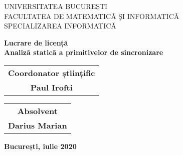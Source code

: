 \begin{titlepage}
    \begin{center}
        \Large
        UNIVERSITATEA BUCUREȘTI
        \\FACULTATEA DE MATEMATICǍ ŞI INFORMATICǍ
        \\SPECIALIZAREA INFORMATICǍ

        \vspace*{4cm}
        \textbf{Lucrare de licență}
        \\\LARGE \textbf{Analiză statică a primitivelor de sincronizare}
        
        \vfill
    \end{center}
    \large
    \hspace*{1.5cm}
    \begin{tabular}{c@{}}
        \textbf{Coordonator științific} \\
        \textbf{Paul Irofti}
    \end{tabular}
    \hfill
    \begin{tabular}{c@{}}
        \textbf{Absolvent} \\
        \textbf{Darius Marian}
    \end{tabular}
    \hspace*{1.5cm}
    \vspace*{3cm}
    \begin{center}
        \textbf{București, iulie 2020}
    \end{center}
\end{titlepage}